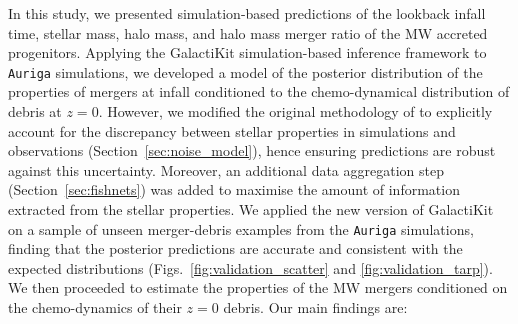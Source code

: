 In this study, we presented simulation-based predictions of the lookback infall time, stellar mass, halo mass, and halo mass merger ratio of the MW accreted progenitors. Applying the GalactiKit simulation-based inference framework to \texttt{Auriga} simulations, we developed a model of the posterior distribution of the properties of mergers at infall conditioned to the chemo-dynamical distribution of debris at $z=0$. However, we modified the original methodology of \cite{Sante2025a} to explicitly account for the discrepancy between stellar properties in simulations and observations (Section~\ref{sec:noise_model}), hence ensuring predictions are robust against this uncertainty. Moreover, an additional data aggregation step (Section~\ref{sec:fishnets}) was added to maximise the amount of information extracted from the stellar properties. We applied the new version of GalactiKit on a sample of unseen merger-debris examples from the \texttt{Auriga} simulations, finding that the posterior predictions are accurate and consistent with the expected distributions (Figs.~\ref{fig:validation_scatter} and \ref{fig:validation_tarp}). We then proceeded to estimate the properties of the MW mergers conditioned on the chemo-dynamics of their $z=0$ debris. Our main findings are:

